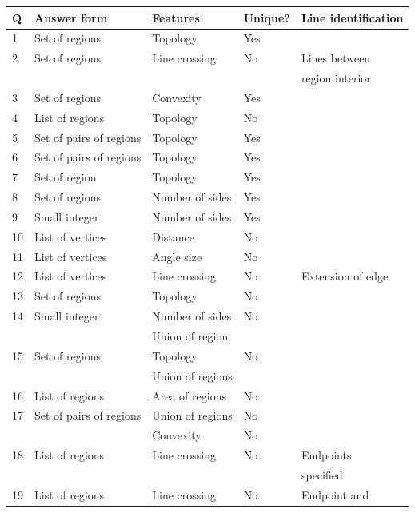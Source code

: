 \documentclass{article}    %
\begin{document}
\begin{table}
\begin{center}
\begin{tabular}{|l|l|l|l|l|} \hline
Q & Answer form     & Features & Unique? & Line identification \\ \hline
1 & Set of regions  & Topology & Yes     & \\ \hline
2 & Set of regions  & Line crossing & No & Lines between \\ 
  &                 &               &    & region interior \\ \hline
3 & Set of regions  & Convexity & Yes    &  \\ \hline
4 & List of regions & Topology  & No     &  \\ \hline
5 & Set of pairs of regions & Topology & Yes & \\ \hline
6 & Set of pairs of regions & Topology & Yes & \\ \hline
7 & Set of region   & Topology & Yes & \\ \hline
8 & Set of regions  & Number of sides & Yes & \\ \hline
9 & Small integer   & Number of sides & Yes & \\ \hline
10 & List of vertices & Distance & No & \\ \hline
11 & List of vertices & Angle size & No & \\ \hline
12 & List of vertices & Line crossing & No & Extension of edge\\ \hline
13 & Set of regions &  Topology & No & \\ \hline
14 & Small integer  & Number of sides & No & \\ \hline
   &                & Union of region &    & \\ \hline
15 & Set of regions & Topology        & No & \\ 
   &                & Union of regions & & \\ \hline
16 & List of regions & Area of regions & No & \\\hline
17 & Set of pairs of regions & Union of regions& No & \\ \hline
	&                         & Convexity & No & \\ \hline
18 & List of regions & Line crossing & No  & Endpoints \\
   &                 &               &     & specified \\ \hline
19 & List of regions & Line crossing & No & Endpoint and \\

\end{tabular}
\end{center}
\end{table}
\end{document}
